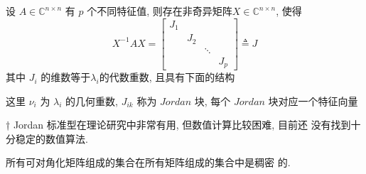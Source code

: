 \documentclass[12pt,a4paper]{article}
\begin{document}
\begin{framed}
	\begin{theorem}
	设 $A ∈ \mathbb{C}^{n×n}$ 有 $p$ 个不同特征值, 则存在非奇异矩阵$ X ∈ \mathbb{C}^{n×n}$, 使得
		$$
		X^{-1} A X=\left[\begin{array}{cccc}{J_{1}} & {} & {} & {} \\ {} & {J_{2}} & {} \\ {} & {} & {\ddots} & {} \\ {} & {} & {} & {J_{p}}\end{array}\right] \triangleq J
		$$
	其中 $J_i$ 的维数等于$ λ_i $的代数重数, 且具有下面的结构


这里 $ν_i$ 为 $λ_i$ 的几何重数, $J_{ik}$ 称为 $Jordan$ 块, 每个 $Jordan$ 块对应一个特征向量	
	\end{theorem}
\end{framed}

\begin{framed}
	† Jordan 标准型在理论研究中非常有用, 但数值计算比较困难, 目前还
	没有找到十分稳定的数值算法.
\end{framed}

\begin{framed}
	\begin{corollary}
		所有可对角化矩阵组成的集合在所有矩阵组成的集合中是稠密
		的.
	\end{corollary}
\end{framed}

\newpage
\end{document}
